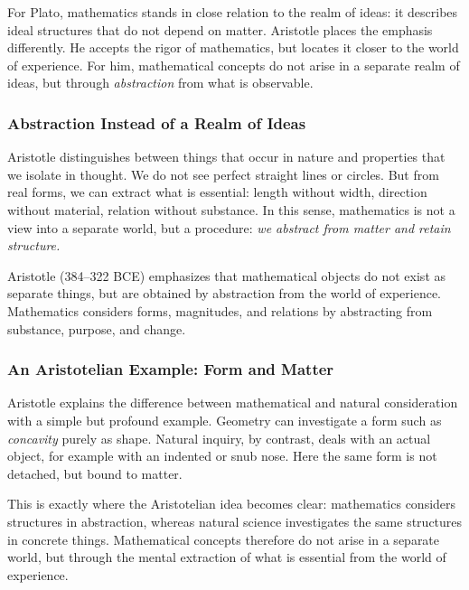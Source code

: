 \medskip

For Plato, mathematics stands in close relation to the realm of ideas:
it describes ideal structures
that do not depend on matter.
Aristotle places the emphasis differently.
He accepts the rigor of mathematics,
but locates it closer to the world of experience.
For him, mathematical concepts do not arise in a separate realm of ideas,
but through \emph{abstraction} from what is observable.

\subsubsection*{Abstraction Instead of a Realm of Ideas}

Aristotle distinguishes between things
that occur in nature
and properties
that we isolate in thought.
We do not see perfect straight lines or circles.
But from real forms, we can extract what is essential:
length without width,
direction without material,
relation without substance.
In this sense, mathematics is not a view into a separate world,
but a procedure:
\emph{we abstract from matter and retain structure.}

\begin{HistoryBox}
	\label{box:aristotle-abstraction}
	\small
	Aristotle (384--322 BCE) emphasizes
	that mathematical objects do not exist as separate things,
	but are obtained by abstraction from the world of experience.
	Mathematics considers forms,
	magnitudes, and relations
	by abstracting from substance,
	purpose, and change.
\end{HistoryBox}

\subsubsection*{An Aristotelian Example: Form and Matter}

Aristotle explains the difference between mathematical and natural consideration
with a simple
but profound example.
Geometry can investigate a form such as \emph{concavity} purely as shape.
Natural inquiry, by contrast, deals with an actual object,
for example with an indented or snub nose.
Here the same form is not detached,
but bound to matter.

This is exactly where the Aristotelian idea becomes clear:
mathematics considers structures in abstraction,
whereas natural science investigates the same structures in concrete things.
Mathematical concepts therefore do not arise in a separate world,
but through the mental extraction of what is essential from the world of experience.

